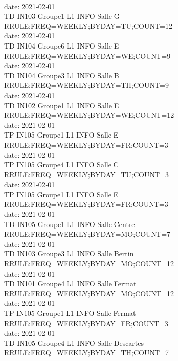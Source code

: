 \documentclass{ltxdoc}
\begin{document}
\begin{center}
\\ date: 2021-02-01\\TD  IN103  Groupe1  L1 INFO  Salle G\\RRULE:FREQ=WEEKLY;BYDAY=TU;COUNT=12
\\ date: 2021-02-01\\TD  IN104  Groupe6  L1 INFO  Salle E\\RRULE:FREQ=WEEKLY;BYDAY=WE;COUNT=9
\\ date: 2021-02-01\\TD  IN104  Groupe3  L1 INFO  Salle B\\RRULE:FREQ=WEEKLY;BYDAY=TH;COUNT=9
\\ date: 2021-02-01\\TD  IN102  Groupe1  L1 INFO  Salle E\\RRULE:FREQ=WEEKLY;BYDAY=WE;COUNT=12
\\ date: 2021-02-01\\TP  IN105  Groupe1  L1 INFO  Salle E\\RRULE:FREQ=WEEKLY;BYDAY=FR;COUNT=3
\\ date: 2021-02-01\\TP  IN105  Groupe4  L1 INFO  Salle C\\RRULE:FREQ=WEEKLY;BYDAY=TU;COUNT=3
\\ date: 2021-02-01\\TP  IN105  Groupe1  L1 INFO  Salle E\\RRULE:FREQ=WEEKLY;BYDAY=FR;COUNT=3
\\ date: 2021-02-01\\TD  IN105  Groupe1  L1 INFO  Salle Centre\\RRULE:FREQ=WEEKLY;BYDAY=MO;COUNT=7
\\ date: 2021-02-01\\TD  IN103  Groupe3  L1 INFO  Salle Bertin\\RRULE:FREQ=WEEKLY;BYDAY=MO;COUNT=12
\\ date: 2021-02-01\\TD  IN101  Groupe4  L1 INFO  Salle Fermat\\RRULE:FREQ=WEEKLY;BYDAY=MO;COUNT=12
\\ date: 2021-02-01\\TP  IN105  Groupe1  L1 INFO  Salle Fermat\\RRULE:FREQ=WEEKLY;BYDAY=FR;COUNT=3
\\ date: 2021-02-01\\TD  IN105  Groupe4  L1 INFO  Salle Descartes\\RRULE:FREQ=WEEKLY;BYDAY=TH;COUNT=7

\end{center}
\end{document}
